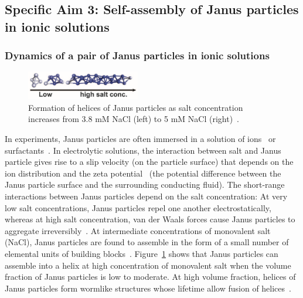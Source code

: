 \subsection{Specific Aim 3: Self-assembly of Janus particles in ionic solutions}
\label{subsec:specific_aim_3}

\subsubsection{Dynamics of a pair of Janus particles in ionic
solutions\label{subsubsec:JP_electrolyte}}
\begin{figure}
  \vspace{-5pt}
\centerline{\includegraphics[width=0.44\textwidth]{Figures/fig2A_Chen2011_Science}}
  \vspace{-5pt}
\caption{\label{fig:helices_of_JPs}Formation of helices
  of Janus particles as salt concentration increases from 3.8 mM NaCl
  (left) to 5 mM NaCl (right)~\cite{Chen2011_Science}.}
\end{figure}
In experiments, Janus particles are often immersed in a solution of
ions~\cite{Chen2011_Science} or surfactants~\cite{Goodwin2009}. In
electrolytic solutions, the interaction between salt and Janus particle
gives rise to a slip velocity (on the particle surface) that depends on
the ion distribution and the zeta potential~\cite{BayatiNajafi2016_JCP}
(the potential difference between the Janus particle surface and the
surrounding conducting fluid). The short-range interactions between
Janus particles depend on the salt concentration: At very low salt
concentrations, Janus particles repel one another electrostatically,
whereas at high salt concentration, van der Waals forces cause Janus
particles to aggregate irreversibly~\cite{Goodwin2009}. At intermediate
concentrations of monovalent salt (NaCl), Janus particles are found to
assemble in the form of a small number of elemental units of building
blocks~\cite{Chen2011_Science}. Figure~\ref{fig:helices_of_JPs} shows
that Janus particles can assemble into a helix at high concentration of
monovalent salt when the volume fraction of Janus particles is low to
moderate. At high volume fraction, helices of Janus particles form
wormlike structures whose lifetime allow fusion of
helices~\cite{Chen2011_Science}. 


